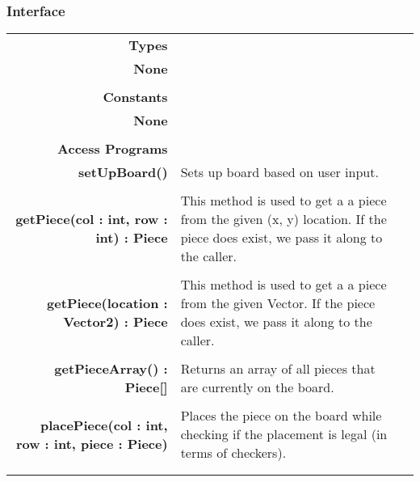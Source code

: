 \documentclass[10pt]{article}
\begin{document}
    \subsubsection{Interface}
        \begin{tabularx}{\linewidth}{@{} >{\bfseries}r Xp{5cm} }
            Types           & \begin{tabular}[t]{@{} l p{8cm}} 
                                     & \\
                                    None & \\
                              \end{tabular} \\
                              
            Constants       & \begin{tabular}[t]{@{} l p{8cm}} 
                                     & \\
                                    None & \\
                              \end{tabular} \\
            Access Programs & \begin{tabular}[t]{@{} p{4cm} p{8cm}}
                                     & \\
                                    setUpBoard() & Sets up board based on user input. \\
                                     & \\
                                    getPiece(col : int, row : int) : Piece & This method is used to get a a piece from the given (x, y) location. If the piece does exist, we pass it along to the caller. \\ 
                                     & \\
									 getPiece(location : Vector2) : Piece & This method is used to get a a piece from the given Vector. If the piece does exist, we pass it along to the caller.\\
									 & \\
									 getPieceArray() : Piece[] & Returns an array of all pieces that are currently on the board.\\
									 & \\
                                    placePiece(col : int, row : int, piece : Piece) & Places the piece on the board while checking if the placement is legal (in terms of checkers). \\
                                     & \\

\end{tabular}
\end{tabularx}
\end{document}
